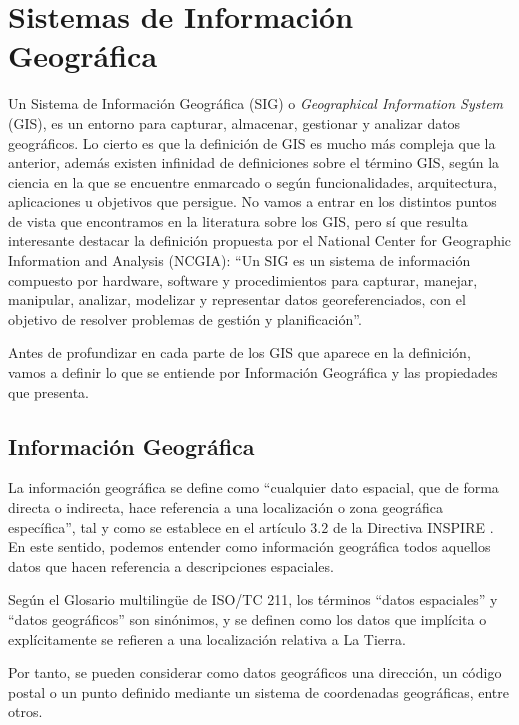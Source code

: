 \chapter*{Sistemas de Información Geográfica}
\setcounter{chapter}{2} 
\setcounter{section}{0}

Un Sistema de Información Geográfica (SIG) o \textit{Geographical Information System} (GIS), es un entorno para capturar, almacenar, gestionar y analizar datos geográficos.
Lo cierto es que la definición de GIS es mucho más compleja que la anterior, además existen infinidad de definiciones sobre el término GIS, 
según la ciencia en la que se encuentre enmarcado o según funcionalidades, arquitectura, aplicaciones u objetivos que persigue. 
No vamos a entrar en los distintos puntos de vista que encontramos en la literatura sobre los GIS, pero sí que resulta interesante destacar la definición propuesta por
el National Center for Geographic Information and Analysis (NCGIA): “Un SIG es un sistema de información compuesto por hardware, software y procedimientos para capturar,
manejar, manipular, analizar, modelizar y representar datos georeferenciados, con el objetivo de resolver problemas de gestión y planificación”.

Antes de profundizar en cada parte de los GIS que aparece en la definición, vamos a definir lo que se entiende por Información Geográfica y las propiedades que presenta.

\section{Información Geográfica} \label{sec:geoinfo}
La información geográfica se define como “cualquier dato espacial, que de forma directa o indirecta, hace referencia a una localización o zona geográfica específica”,
tal y como se establece en el artículo 3.2 de la Directiva INSPIRE \cite{directiva-INSPIRE}. 
En este sentido, podemos entender como información geográfica todos aquellos datos que hacen referencia a descripciones espaciales.

Según el Glosario multilingüe de ISO/TC 211, los términos “datos espaciales” y “datos geográficos” son sinónimos, y
se definen como los datos que implícita o explícitamente se refieren a una localización relativa a La Tierra.

Por tanto, se pueden considerar como datos geográficos una dirección, un código postal o un punto definido mediante un sistema de coordenadas geográficas, entre otros.

